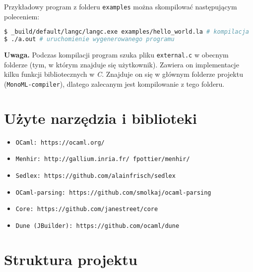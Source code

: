 \documentclass[declaration,shortabstract]{iithesis}
\begin{document}
Przykładowy program z folderu \texttt{examples} można skompilować następującym 
poleceniem: 
\begin{lstlisting}[language=bash]
$ _build/default/langc/langc.exe examples/hello_world.la # kompilacja 
$ ./a.out # uruchomienie wygenerowanego programu 
\end{lstlisting}

\textbf{Uwaga.} Podczas kompilacji program szuka pliku \texttt{external.c} w 
obecnym folderze (tym, w którym znajduje się użytkownik). Zawiera on  
implementacje kilku funkcji bibliotecznych w \textit{C}. Znajduje on się w 
głównym folderze projektu (\texttt{MonoML-compiler}), dlatego zalecanym jest 
kompilowanie z tego folderu.

\section{Użyte narzędzia i biblioteki}

\begin{itemize}
  \item \texttt{OCaml: https://ocaml.org/}
  \item \texttt{Menhir: http://gallium.inria.fr/~fpottier/menhir/}
  \item \texttt{Sedlex: https://github.com/alainfrisch/sedlex}
  \item \texttt{OCaml-parsing: https://github.com/smolkaj/ocaml-parsing}
  \item \texttt{Core: https://github.com/janestreet/core} 
  \item \texttt{Dune (JBuilder): https://github.com/ocaml/dune} 
\end{itemize}



\section{Struktura projektu}
\end{document}
